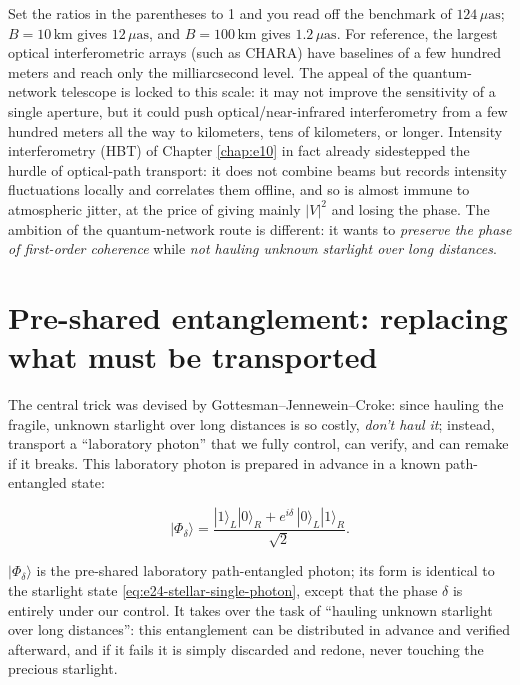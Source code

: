 Set the ratios in the parentheses to 1 and you read off the benchmark of \(124\,\mu\mathrm{as}\); \(B=10\,\mathrm{km}\) gives \(12\,\mu\mathrm{as}\), and \(B=100\,\mathrm{km}\) gives \(1.2\,\mu\mathrm{as}\). For reference, the largest optical interferometric arrays (such as CHARA) have baselines of a few hundred meters and reach only the milliarcsecond level. The appeal of the quantum-network telescope is locked to this scale: it may not improve the sensitivity of a single aperture, but it could push optical/near-infrared interferometry from a few hundred meters all the way to kilometers, tens of kilometers, or longer. Intensity interferometry (HBT) of Chapter \ref{chap:e10} in fact already sidestepped the hurdle of optical-path transport: it does not combine beams but records intensity fluctuations locally and correlates them offline, and so is almost immune to atmospheric jitter, at the price of giving mainly \(|V|^2\) and losing the phase. The ambition of the quantum-network route is different: it wants to \emph{preserve the phase of first-order coherence} while \emph{not hauling unknown starlight over long distances}.

\section{Pre-shared entanglement: replacing what must be transported}
\label{sec:e24-gjc}

The central trick was devised by Gottesman--Jennewein--Croke: since hauling the fragile, unknown starlight over long distances is so costly, \emph{don't haul it}; instead, transport a ``laboratory photon'' that we fully control, can verify, and can remake if it breaks. This laboratory photon is prepared in advance in a known path-entangled state:

\begin{equation}
  |\Phi_\delta\rangle
  =
  \frac{|1\rangle_L|0\rangle_R
  +
  e^{i\delta}\,|0\rangle_L|1\rangle_R}{\sqrt2}.
  \label{eq:e24-lab-entangled-photon}
\end{equation}
\begin{formulaexplain}
\(|\Phi_\delta\rangle\) is the pre-shared laboratory path-entangled photon; its form is identical to the starlight state \eqref{eq:e24-stellar-single-photon}, except that the phase \(\delta\) is entirely under our control. It takes over the task of ``hauling unknown starlight over long distances'': this entanglement can be distributed in advance and verified afterward, and if it fails it is simply discarded and redone, never touching the precious starlight.
\end{formulaexplain}

